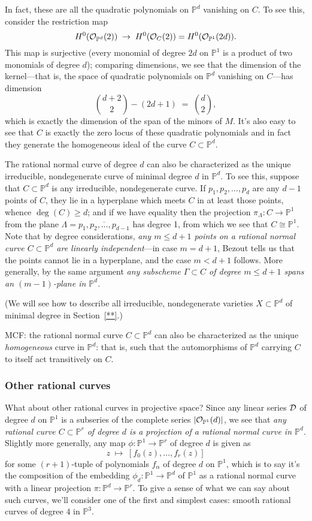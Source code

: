 \documentclass[12pt, leqno]{article}
\def\PP{{\mathbb P}}
\def\cO{{\cal O}}
\def\cD{{\cal D}}
\begin{document}
In fact, these are all the quadratic polynomials on $\PP^d$ vanishing on $C$. To see this, consider the restriction map
$$
H^0(\cO_{\PP^d}(2)) \; \to \; H^0(\cO_{C}(2)) = H^0(\cO_{\PP^1}(2d)).
$$
This map is surjective (every monomial of degree $2d$ on $\PP^1$ is a product of two monomials of degree $d$); comparing dimensions, we see that the dimension of the kernel---that is, the space of quadratic polynomials on $\PP^d$ vanishing on $C$---has dimension
$$
\binom{d+2}{2} - (2d+1) \; = \; \binom{d}{2},
$$
which is exactly the dimension of the span of the minors of $M$. It's also easy to see that $C$ is exactly the zero locus of these quadratic polynomials  and in fact they generate the homogeneous ideal of the curve $C \subset \PP^d$.

The rational normal curve of degree $d$ can also be characterized as the unique irreducible, nondegenerate curve of minimal degree $d$ in $\PP^d$. To see this, suppose that $C \subset \PP^d$ is any irreducible, nondegenerate curve. If $p_1,p_2,\dots,p_{d}$ are any $d-1$ points of $C$, they lie in a hyperplane which meets $C$ in at least those points, whence $\deg(C) \geq d$; and if we have equality then the projection $\pi_\Lambda : C \to \PP^1$ from the plane $\Lambda = \overline{p_1,p_2,\dots,p_{d-1}}$ has degree 1, from which we see that $C \cong \PP^1$.  Note that by degree considerations, \emph{any $m \leq d+1$ points on a rational normal curve $C \subset \PP^d$ are linearly independent}---in case $m=d+1$, Bezout tells us that the points cannot lie in a hyperplane, and the case $m < d+1$ follows. More generally, by the same argument \emph{any subscheme $\Gamma \subset C$ of degree $m \leq d+1$ spans an $(m-1)$-plane in $\PP^d$}.

(We will see how to describe all irreducible, nondegenerate varieties $X \subset \PP^d$ of minimal degree in Section~\ref{**}.)

MCF: the rational normal curve $C \subset \PP^d$ can also be characterized as the unique \emph{homogeneous} curve in $\PP^d$: that is, such that the automorphisms of $\PP^d$ carrying $C$ to itself act transitively on $C$.

\subsubsection{Other rational curves}

What about other rational curves in projective space? Since any linear series $\cD$ of degree $d$ on $\PP^1$ is a subseries of the complete series $|\cO_{\PP^1}(d)|$, we see that \emph{any rational curve $C \subset \PP^r$ of degree $d$ is a projection of a rational normal curve in $\PP^d$}. Slightly more generally, any map $\phi : \PP^1 \to \PP^r$ of degree $d$ is given as
$$
z \; \mapsto \; [f_0(z), \dots, f_r(z)]
$$
for some $(r+1)$-tuple of polynomials $f_\alpha$ of degree $d$ on $\PP^1$, which is to say it's the composition of the embedding $\phi_d : \PP^1 \to \PP^d$ of $\PP^1$ as a rational normal curve with a linear projection $\pi : \PP^d \to \PP^r$. To give a sense of what we can say about such curves, we'll consider one of the first and simplest cases: smooth rational curves of degree $4$ in $\PP^3$.
\end{document}
